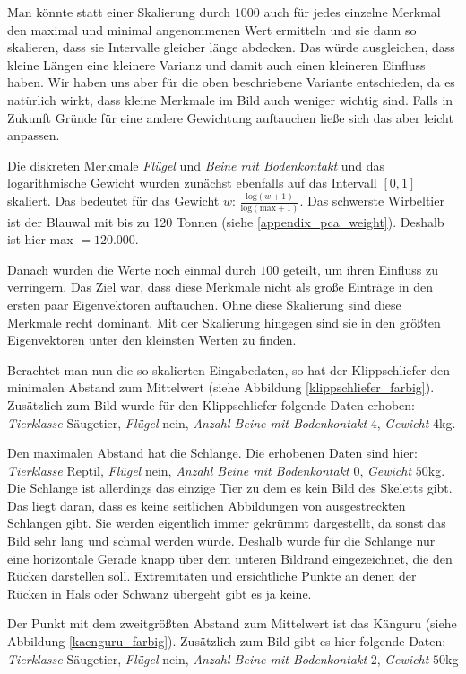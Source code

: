 Man könnte statt einer Skalierung durch $1000$ auch für jedes einzelne Merkmal den maximal und minimal angenommenen Wert ermitteln und sie dann so skalieren, dass sie Intervalle gleicher länge abdecken. Das würde ausgleichen, dass \zb kleine Längen eine kleinere Varianz und damit auch einen kleineren Einfluss haben.
 Wir haben uns aber für die oben beschriebene Variante entschieden, da es natürlich wirkt, dass kleine Merkmale im Bild auch weniger wichtig sind. Falls in Zukunft Gründe für eine andere Gewichtung auftauchen ließe sich das aber leicht anpassen.
 
 Die diskreten Merkmale \emph{Flügel} und \emph{Beine mit Bodenkontakt} und das logarithmische Gewicht wurden zunächst ebenfalls auf das Intervall $[0, 1]$ skaliert. Das bedeutet für das Gewicht $w$: $\frac{\mathrm{log}(w+1)}{\mathrm{log}(\mathrm{max}+1)}$. Das schwerste Wirbeltier ist der Blauwal mit bis zu 120 Tonnen (siehe \ref{appendix_pca_weight}). Deshalb ist hier max $= 120.000$.
 
 Danach wurden die Werte noch einmal durch $100$ geteilt, um ihren Einfluss zu verringern. Das Ziel war, dass diese Merkmale nicht als große Einträge in den ersten paar Eigenvektoren auftauchen. Ohne diese Skalierung sind diese Merkmale recht dominant. Mit der Skalierung hingegen sind sie in den größten Eigenvektoren unter den kleinsten Werten zu finden.
 
 Berachtet man nun die so skalierten Eingabedaten, so hat der Klippschliefer den minimalen Abstand zum Mittelwert (siehe Abbildung \ref{klippschliefer_farbig}). Zusätzlich zum Bild wurde für den Klippschliefer folgende Daten erhoben:
 \emph{Tierklasse} Säugetier, \emph{Flügel} nein, \emph{Anzahl Beine mit Bodenkontakt} $4$, \emph{Gewicht} $4$kg.
 
 Den maximalen Abstand hat die Schlange. Die erhobenen Daten sind hier:
 \emph{Tierklasse} Reptil, \emph{Flügel} nein, \emph{Anzahl Beine mit Bodenkontakt} $0$, \emph{Gewicht} $50$kg. Die Schlange ist allerdings das einzige Tier zu dem es kein Bild des Skeletts gibt. Das liegt daran, dass es keine seitlichen Abbildungen von ausgestreckten Schlangen gibt. Sie werden eigentlich immer gekrümmt dargestellt, da sonst das Bild sehr lang und schmal werden würde. Deshalb wurde für die Schlange nur eine horizontale Gerade knapp über dem unteren Bildrand eingezeichnet, die den Rücken darstellen soll. Extremitäten und ersichtliche Punkte an denen der Rücken in Hals oder Schwanz übergeht gibt es ja keine.
 
 Der Punkt mit dem zweitgrößten Abstand zum Mittelwert ist das Känguru (siehe Abbildung \ref{kaenguru_farbig}). Zusätzlich zum Bild gibt es hier folgende Daten:
  \emph{Tierklasse} Säugetier, \emph{Flügel} nein, \emph{Anzahl Beine mit Bodenkontakt} $2$, \emph{Gewicht} $50$kg
 
